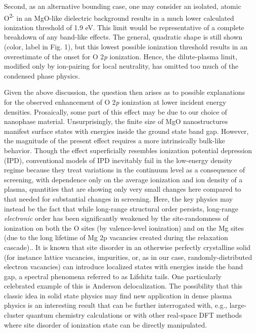 Second, as an alternative bounding case, one may consider an isolated,
atomic O\textsuperscript{2-} in an MgO-like dielectric background
results in a much lower calculated ionization threshold of 1.9 eV. This
limit would be representative of a complete breakdown of any band-like
effects. The general, quadratic shape is still shown (color, label in
Fig. 1), but this lowest possible ionization threshold results in an
overestimate of the onset for O 2\emph{p} ionization. Hence, the
dilute-plasma limit, modified only by ion-pairing for local neutrality,
has omitted too much of the condensed phase physics.

Given the above discussion, the question then arises as to possible
explanations for the observed enhancement of O 2\emph{p} ionization at
lower incident energy densities. Prosaically, some part of this effect
may be due to our choice of nanophase material. Unsurprisingly, the
finite size of MgO nanostructures manifest surface states with energies
inside the ground state band gap.  However, the magnitude of the
present effect requires a more intrinsically bulk-like behavior. Though
the effect superficially resembles ionization potential depression
(IPD), conventional models of IPD inevitably fail in the low-energy
density regime because they treat variations in the continuum level as a
consequence of screening, with dependence only on the average ionization
and ion density of a plasma, quantities that are showing only very small
changes here compared to that needed for substantial changes in
screening. \cite{CIRICOSTA2016MEASUREMENTS, VINKO2014DENSITY} Here, the key physics may instead be the fact that
while long-range structural order persists, long-range \emph{electronic}
order has been significantly weakened by the site-randomness of
ionization on both the O sites (by valence-level ionization) and on the
Mg sites (due to the long lifetime of Mg 2p vacancies created during the
relaxation cascade).. It is known that site disorder in an otherwise
perfectly crystalline solid (for instance lattice vacancies, impurities,
or, as in our case, randomly-distributed electron vacancies) can
introduce localized states with energies inside the band gap, a spectral
phenomena referred to as Lifshitz tails. \cite{NIEUWENHUIZEN1989TRAPPING} One particularly
celebrated example of this is Anderson delocalization. \cite{DE1998DELOCALIZATION} The
possibility that this classic idea in solid state physics may find new
application in dense plasma physics is an interesting result that can be
further interrogated with, e.g., large-cluster quantum chemistry
calculations or with other real-space DFT methods where site disorder of
ionization state can be directly manipulated.

